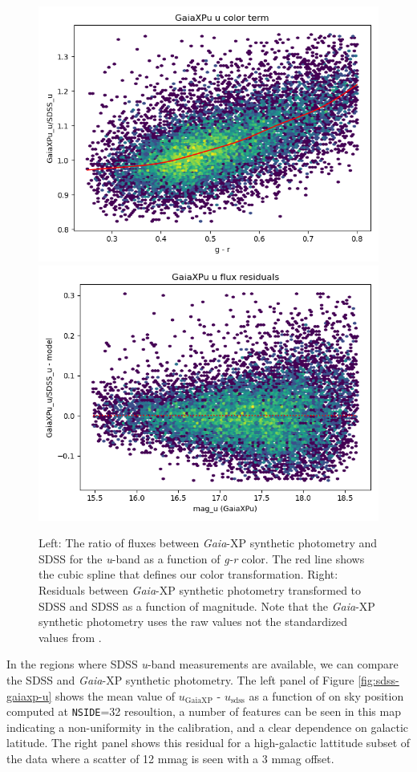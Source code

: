 \begin{figure}
    \includegraphics[width=0.49\linewidth]{./figures/color_terms/GaiaXPu_to_SDSS_band_u_color_term.png}
    \includegraphics[width=0.49\linewidth]{./figures/color_terms/GaiaXPu_to_SDSS_band_u_flux_residuals.png}
    \caption{Left: The ratio of fluxes between \emph{Gaia}-XP synthetic photometry and SDSS for the \textit{u}-band as a function of \textit{g-r} color. The red line shows the cubic spline that defines our color transformation.
    Right: Residuals between \emph{Gaia}-XP synthetic photometry transformed to SDSS and SDSS as a function of magnitude.
    Note that the \emph{Gaia}-XP synthetic photometry uses the raw values not the standardized values from \citet{GaiaCollaboration:2023-XP}.}
    \label{fig:color-gaiaxp-usdss-u}
\end{figure}


In the regions where SDSS \textit{u}-band measurements are available, we can compare the SDSS and \emph{Gaia}-XP synthetic photometry.
The left panel of Figure \ref{fig:sdss-gaiaxp-u} shows the mean value of $u_{\mathrm{GaiaXP}}$ - $u_{\mathrm{sdss}}$ as a function of on sky position computed at \texttt{NSIDE}=32 resoultion, a number of features can be seen in this map indicating a non-uniformity in the calibration, and a clear dependence on galactic latitude.
The right panel shows this residual for a high-galactic lattitude subset of the data where a scatter of 12 mmag is seen with a 3 mmag offset.

